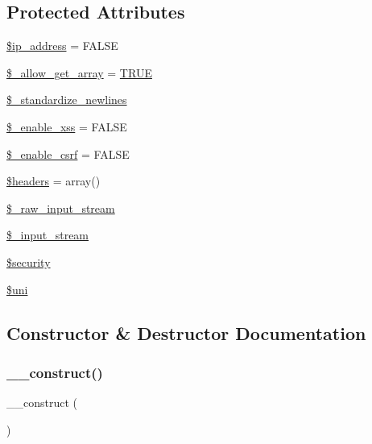 \subsection*{Protected Attributes}
\begin{DoxyCompactItemize}
\item 
\mbox{\hyperlink{class_c_i___input_a614e10d1ab6dcf06fa7fef37af7b7eee}{\$ip\+\_\+address}} = F\+A\+L\+SE
\item 
\mbox{\hyperlink{class_c_i___input_a359b1debb6f1d80e345d6215af6946fb}{\$\+\_\+allow\+\_\+get\+\_\+array}} = \mbox{\hyperlink{constants_8php_ae04a3efe6aa42044f803ee90c2277846}{T\+R\+UE}}
\item 
\mbox{\hyperlink{class_c_i___input_ad9ebdfce8f992b3a41aaf64ea8782933}{\$\+\_\+standardize\+\_\+newlines}}
\item 
\mbox{\hyperlink{class_c_i___input_a42b707bea5d9604a7460e953d9e39d7d}{\$\+\_\+enable\+\_\+xss}} = F\+A\+L\+SE
\item 
\mbox{\hyperlink{class_c_i___input_a463c89c07e7cf7f5e4337a2a8e460d17}{\$\+\_\+enable\+\_\+csrf}} = F\+A\+L\+SE
\item 
\mbox{\hyperlink{class_c_i___input_a52500036ee807241b8b4b7e2367c49ef}{\$headers}} = array()
\item 
\mbox{\hyperlink{class_c_i___input_a6f70bcba6388b55275db11f519649441}{\$\+\_\+raw\+\_\+input\+\_\+stream}}
\item 
\mbox{\hyperlink{class_c_i___input_aa67cd17f9c04d6c58d10a80630e4faf2}{\$\+\_\+input\+\_\+stream}}
\item 
\mbox{\hyperlink{class_c_i___input_a7ef3408af92597c92305e22f79e67d61}{\$security}}
\item 
\mbox{\hyperlink{class_c_i___input_a6ed6e0f7f970550e288f83845eec6393}{\$uni}}
\end{DoxyCompactItemize}


\subsection{Constructor \& Destructor Documentation}
\mbox{\label{class_c_i___input_a095c5d389db211932136b53f25f39685}} 
\subsubsection{\texorpdfstring{\+\_\+\+\_\+construct()}{\_\_construct()}}
{\footnotesize\ttfamily \+\_\+\+\_\+construct (\begin{DoxyParamCaption}{ }\end{DoxyParamCaption})}

